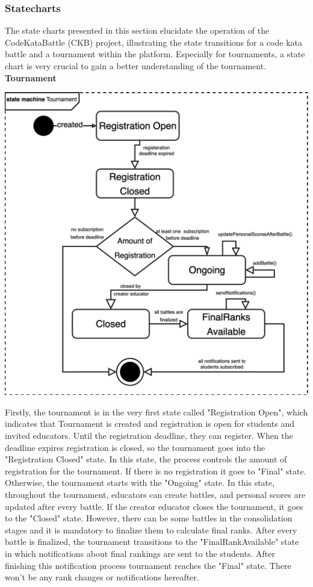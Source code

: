 \subsubsection{Statecharts}
The state charts presented in this section elucidate the operation of the CodeKataBattle (CKB) project, illustrating the state transitions for a code kata battle and a tournament within the platform. Especially for tournaments, a state chart is very crucial to gain a better understanding of the tournament.\newline
\textbf{Tournament}
\begin{center}
    \includegraphics[scale=0.2]{Images/tournamentStatechart.jpeg}
\end{center}
Firstly, the tournament is in the very first state called "Registration Open", which indicates that Tournament is created and registration is open for students and invited educators. Until the registration deadline, they can register. When the deadline expires registration is closed, so the tournament goes into the "Registration Closed" state. In this state, the process controls the amount of registration for the tournament. If there is no registration it goes to "Final" state. Otherwise, the tournament starts with the "Ongoing" state. In this state, throughout the tournament, educators can create battles, and personal scores are updated after every battle. If the creator educator closes the tournament, it goes to the "Closed" state. However, there can be some battles in the consolidation stages and it is mandatory to finalize them to calculate final ranks. After every battle is finalized, the tournament transitions to the "FinalRankAvailable" state in which notifications about final rankings are sent to the students. After finishing this notification process tournament reaches the "Final" state. There won't be any rank changes or notifications hereafter. \newpage
